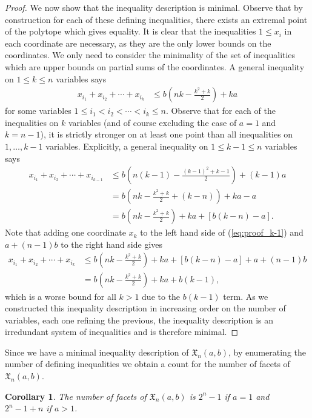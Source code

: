 \documentclass[11pt]{amsart}
\newtheorem{corollary}[theorem]{Corollary}
\theoremstyle{definition}
\newcommand{\0}{\emptyset}
\newcommand{\Xn}{\mathfrak{X}_{n}(a,b)}
\begin{document}
\begin{proof}
We now show that the inequality description is minimal.
Observe that by construction for each of these defining inequalities, there exists an extremal point of the polytope which gives equality.
It is clear that the inequalities $1\leq x_i$ in each coordinate are necessary, as they are the only lower bounds on the coordinates. 
We only need to consider the minimality of the set of inequalities which are upper bounds on partial sums of the coordinates.
A general inequality on $1 \leq k \leq n$ variables says
\begin{align*}
    x_{i_1} + x_{i_2} + \cdots + x_{i_k} &\leq b\left(nk - \frac{k^2+k}{2}\right) + ka
\end{align*}
for some variables $1 \leq i_1 < i_2 < \cdots < i_k \leq n$.
Observe that for each of the inequalities on $k$ variables (and of course excluding the case of $a=1$ and $k=n-1$), it is strictly stronger on at least one point than all inequalities on $1, \ldots, k-1$ variables. 
Explicitly, a general inequality on $1 \leq k-1 \leq n$ variables says
\begin{align}
    x_{i_1} + x_{i_2} + \cdots + x_{i_{k-1}} &\leq b\left(n(k-1) - \frac{(k-1)^2+k-1}{2}\right) + (k-1)a\label{eq:proof_k-1}\\
    &= b\left(nk - \frac{k^2+k}{2} +(k-n)\right) + ka -a\nonumber\\
    &= b\left(nk - \frac{k^2+k}{2}\right) + ka +[b(k-n) -a].\nonumber
\end{align}
Note that adding one coordinate $x_k$ to the left hand side of (\ref{eq:proof_k-1}) and $a+(n-1)b$ to the right hand side gives
\begin{align*} x_{i_1} + x_{i_2} + \cdots + x_{i_k} &\leq b\left(nk - \frac{k^2+k}{2}\right) + ka +[b(k-n) -a] + a+(n-1)b\\
&= b\left(nk - \frac{k^2+k}{2}\right) + ka +b(k-1),
\end{align*}
which is a worse bound for all $k > 1$ due to the $b(k-1)$ term.
As we constructed this inequality description in increasing order on the number of variables, each one refining the previous, the inequality description is an irredundant system of inequalities and is therefore minimal.
\end{proof}


Since we have a minimal inequality description of $\Xn$, by enumerating the number of defining inequalities we obtain a count for the number of facets of $\Xn$.

\begin{corollary}\label{thm:x-facets}
The number of facets of $\Xn$ is $2^n-1$ if $a=1$ and $2^n-1+n$ if $a > 1$.
\end{corollary}
\end{document}
